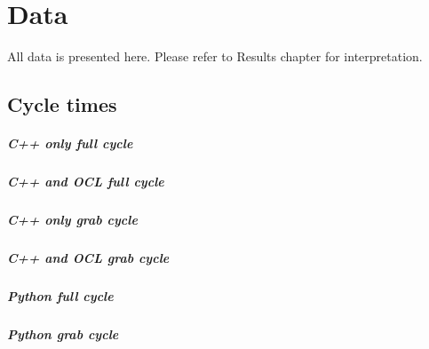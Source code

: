 \chapter{Data}
All data is presented here. Please refer to Results chapter for interpretation.
\section{Cycle times}
\paragraph{C++ only full cycle}
\label{dat:cppfullcycle}
\begin{alltt}

\end{alltt}

\paragraph{C++ and OCL full cycle}
\label{dat:cppoclfullcycle}
\begin{alltt}

\end{alltt}

\paragraph{C++ only grab cycle}
\label{dat:cppgrabcycle}
\begin{alltt}

\end{alltt}

\paragraph{C++ and OCL grab cycle}
\label{dat:cppoclgrabcycle}
\begin{alltt}

\end{alltt}

\paragraph{Python full cycle}
\label{dat:pyfullcycle}
\begin{alltt}

\end{alltt}

\paragraph{Python grab cycle}
\label{dat:[pygrabcycle}
\begin{alltt}

\end{alltt}
